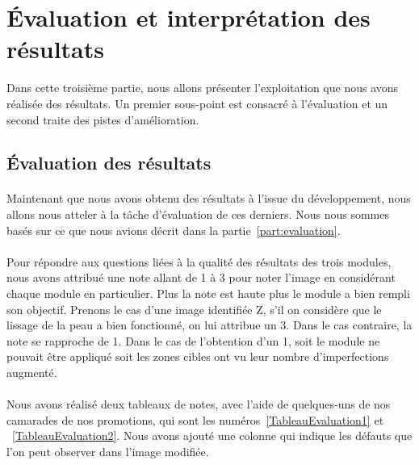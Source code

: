 \documentclass[11pt, french]{report-rd-info}
\begin{document}
\section{Évaluation et interprétation des résultats}
Dans cette troisième partie, nous allons présenter l'exploitation que nous avons réalisée des résultats. Un premier sous-point est consacré à l'évaluation et un second traite des pistes d'amélioration.

\subsection{Évaluation des résultats}
\paragraph*{}
Maintenant que nous avons obtenu des résultats à l'issue du développement, nous allons nous atteler à la tâche d'évaluation de ces derniers. Nous nous sommes basés sur ce que nous avions décrit dans la partie~\ref{part:evaluation}. 

\paragraph*{}
Pour répondre aux questions liées à la qualité des résultats des trois modules, nous avons attribué une note allant de 1 à 3 pour noter l'image en considérant chaque module en particulier. Plus la note est haute plus le module a bien rempli son objectif. Prenons le cas d'une image identifiée Z, s'il on considère que le lissage de la peau a bien fonctionné, on lui attribue un 3. Dans le cas contraire, la note se rapproche de 1. Dans le cas de l'obtention d'un 1, soit le module ne pouvait être appliqué soit les zones cibles ont vu leur nombre d'imperfections augmenté.

\paragraph*{}
Nous avons réalisé deux tableaux de notes, avec l'aide de quelques-uns de nos camarades de nos promotions, qui sont les numéros~\ref{TableauEvaluation1} et ~\ref{TableauEvaluation2}. Nous avons ajouté une colonne qui indique les défauts que l'on peut observer dans l'image modifiée.
\end{document}

